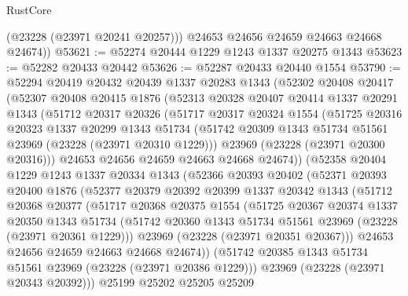 \begin{lexlean}{RustCore}
\begin{coremodule}
          (@23228 (@23971 @20241 @20257)))
        @24653
        @24656
        @24659
        @24663
        @24668
        @24674))
@53621 := @52274 @20444 @1229 @1243 @1337 @20275 @1343
@53623 := @52282 @20433 @20442
@53626 := @52287 @20433 @20440 @1554
@53790 := @52294
    @20419
    @20432
    @20439
    @1337
    @20283
    @1343
    (@52302
      @20408
      @20417
      (@52307
        @20408
        @20415
        @1876
        (@52313
          @20328
          @20407
          @20414
          @1337
          @20291
          @1343
          (@51712
            @20317
            @20326
            (@51717
              @20317
              @20324
              @1554
              (@51725
                @20316
                @20323
                @1337
                @20299
                @1343
                @51734
                (@51742 @20309 @1343 @51734 @51561 @23969 (@23228 (@23971 @20310 @1229)))
                @23969
                (@23228 (@23971 @20300 @20316)))
              @24653
              @24656
              @24659
              @24663
              @24668
              @24674))
          (@52358
            @20404
            @1229
            @1243
            @1337
            @20334
            @1343
            (@52366
              @20393
              @20402
              (@52371
                @20393
                @20400
                @1876
                (@52377
                  @20379
                  @20392
                  @20399
                  @1337
                  @20342
                  @1343
                  (@51712
                    @20368
                    @20377
                    (@51717
                      @20368
                      @20375
                      @1554
                      (@51725
                        @20367
                        @20374
                        @1337
                        @20350
                        @1343
                        @51734
                        (@51742 @20360 @1343 @51734 @51561 @23969 (@23228 (@23971 @20361 @1229)))
                        @23969
                        (@23228 (@23971 @20351 @20367)))
                      @24653
                      @24656
                      @24659
                      @24663
                      @24668
                      @24674))
                  (@51742 @20385 @1343 @51734 @51561 @23969 (@23228 (@23971 @20386 @1229)))
                  @23969
                  (@23228 (@23971 @20343 @20392)))
                @25199
                @25202
                @25205
                @25209

\end{coremodule}
\end{lexlean}
